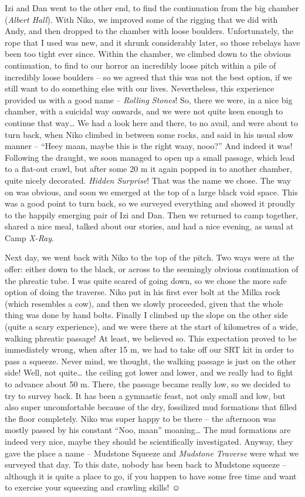 Izi and Dan went to the other end, to find the continuation from the big
chamber (\emph{Albert Hall}). With Niko, we improved some of the rigging
that we did with Andy, and then dropped to the chamber with loose
boulders. Unfortunately, the rope that I used was new, and it shrunk
considerably later, so those rebelays have been too tight ever since.
Within the chamber, we climbed down to the obvious continuation, to find
to our horror an incredibly loose pitch within a pile of incredibly
loose boulders -- so we agreed that this was not the best option, if we
still want to do something else with our lives. Nevertheless, this
experience provided us with a good name -- \emph{Rolling Stones}! So,
there we were, in a nice big chamber, with a suicidal way onwards, and
we were not quite keen enough to continue that way\ldots{} We had a look
here and there, to no avail, and were about to turn back, when Niko
climbed in between some rocks, and said in his usual slow manner --
``Heey maan, maybe this is the right waay, nooo?'' And indeed it was!
Following the draught, we soon managed to open up a small passage, which
lead to a flat-out crawl, but after some 20 m it again popped in to
another chamber, quite nicely decorated. \emph{Hidden Surprise}! That
was the name we chose. The way on was obvious, and soon we emerged at
the top of a large black void space. This was a good point to turn back,
so we surveyed everything and showed it proudly to the happily emerging
pair of Izi and Dan. Then we returned to camp together, shared a nice
meal, talked about our stories, and had a nice evening, as usual at Camp
\emph{X-Ray}.

Next day, we went back with Niko to the top of the pitch. Two ways were
at the offer: either down to the black, or across to the seemingly
obvious continuation of the phreatic tube. I was quite scared of going
down, so we chose the more safe option of doing the traverse. Niko put
in his first ever bolt at the Milka rock (which resembles a cow), and
then we slowly proceeded, given that the whole thing was done by hand
bolts. Finally I climbed up the slope on the other side (quite a scary
experience), and we were there at the start of kilometres of a wide,
walking phreatic passage! At least, we believed so. This expectation
proved to be immediately wrong, when after 15 m, we had to take off our
SRT kit in order to pass a squeeze. Never mind, we thought, the walking
passage is just on the other side! Well, not quite\ldots{} the ceiling
got lower and lower, and we really had to fight to advance about 50 m.
There, the passage became really low, so we decided to try to survey
back. It has been a gymnastic feast, not only small and low, but also
super uncomfortable because of the dry, fossilized mud formations that
filled the floor completely. Niko was super happy to be there -- the
afternoon was mostly passed by his constant ``Noo, maan''
moaning\ldots{} The mud formations are indeed very nice, maybe they
should be scientifically investigated. Anyway, they gave the place a
name -- Mudstone Squeeze and \emph{Mudstone Traverse} were what we
surveyed that day. To this date, nobody has been back to Mudstone
squeeze -- although it is quite a place to go, if you happen to have
some free time and want to exercise your squeezing and crawling skills!
☺

